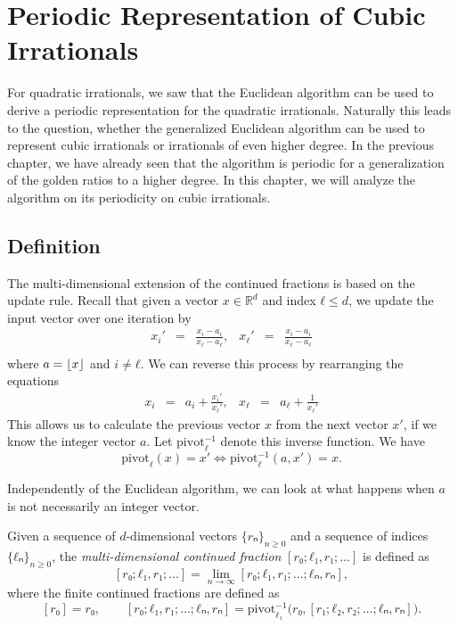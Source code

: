 \chapter{Periodic Representation of Cubic Irrationals}

For quadratic irrationals, we saw that the Euclidean algorithm can be used to
derive a periodic representation for the quadratic irrationals.
Naturally this leads to the question, whether the generalized Euclidean
algorithm can be used to represent cubic irrationals or irrationals of even
higher degree.
In the previous chapter, we have already seen that the algorithm is periodic
for a generalization of the golden ratios to a higher degree.
In this chapter, we will analyze the algorithm on its periodicity on cubic
irrationals.

\section{Definition}

The multi-dimensional extension of the continued fractions is based on the
update rule. Recall that given a vector $x ∈ ℝ^d$ and index $ℓ ≤ d$, we update
the input vector over one iteration by
\[
  \begin{array}{lcrlcr}
    \displaystyle x_i' & = & \displaystyle \frac{x_i - a_i}{x_ℓ - a_ℓ}, &
    \displaystyle x_ℓ' & = & \displaystyle \frac{x_i - a_i}{x_ℓ - a_ℓ} \\[1em]
  \end{array}
\]
where $a = \lfloor x\rfloor$ and $i ≠ ℓ$.
We can reverse this process by rearranging the equations
\[
  \begin{array}{lcrlcr}
    \displaystyle x_i & = & a_i + \displaystyle \frac{x_i'}{x_ℓ'}, &
    \displaystyle x_ℓ & = & a_ℓ + \displaystyle \frac{1}{x_ℓ'}
  \end{array}
\]
This allows us to calculate the previous vector $x$ from the next vector $x'$,
if we know the integer vector $a$.
Let $\mathrm{pivot}_ℓ^{-1}$ denote this inverse function.
We have
\[
  \mathrm{pivot}_ℓ(x) = x' \iff \mathrm{pivot}_ℓ^{-1}(a, x') = x.
\]

Independently of the Euclidean algorithm,
we can look at what happens when $a$ is not necessarily an integer vector.

\begin{definition}
  Given a sequence of $d$-dimensional vectors $\{rₙ\}_{n ≥ 0}$ and a sequence of
  indices $\{ℓₙ\}_{n ≥ 0}$, the \emph{multi-dimensional continued fraction} $[r₀; ℓ₁, r₁; …]$
  is defined as
  \[
    [r₀; ℓ₁, r₁; …] = \lim_{n → ∞} [r₀; ℓ₁, r₁; …; ℓₙ, rₙ],
  \]
  where the finite continued fractions are defined as
  \[
    [r₀] = r₀, \qquad [r₀; ℓ₁, r₁; …; ℓₙ, rₙ] = \mathrm{pivot}_{ℓ₁}^{-1}\big(r₀, [r₁; ℓ₂, r₂; …; ℓₙ, rₙ]\big).
  \]
\end{definition}

